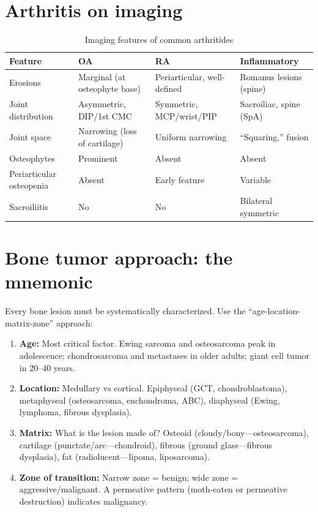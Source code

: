\section{Arthritis on imaging}

\begin{table}[h]
\centering
\caption{Imaging features of common arthritides}
\label{tab:arthritis}
\begin{tabular}{@{}p{}p{}p{}p{}@{}}
\hline
\textbf{Feature} & \textbf{OA} & \textbf{RA} & \textbf{Inflammatory} \\
\hline
Erosions & Marginal (at osteophyte base) & Periarticular, well-defined & Romanus lesions (spine) \\
Joint distribution & Asymmetric, DIP/1st CMC & Symmetric, MCP/wrist/PIP & Sacroiliac, spine (SpA) \\
Joint space & Narrowing (loss of cartilage) & Uniform narrowing & ``Squaring,'' fusion \\
Osteophytes & Prominent & Absent & Absent \\
Periarticular osteopenia & Absent & Early feature & Variable \\
Sacroiliitis & No & No & Bilateral symmetric \\
\hline
\end{tabular}
\end{table}

\section{Bone tumor approach: the mnemonic}
Every bone lesion must be systematically characterized. Use the ``age-location-matrix-zone'' approach:

\begin{enumerate}
    \item \textbf{Age:} Most critical factor. Ewing sarcoma and osteosarcoma peak in adolescence; chondrosarcoma and metastases in older adults; giant cell tumor in 20--40 years.
    \item \textbf{Location:} Medullary vs cortical. Epiphyseal (GCT, chondroblastoma), metaphyseal (osteosarcoma, enchondroma, ABC), diaphyseal (Ewing, lymphoma, fibrous dysplasia).
    \item \textbf{Matrix:} What is the lesion made of? Osteoid (cloudy/bony---osteosarcoma), cartilage (punctate/arc---chondroid), fibrous (ground glass---fibrous dysplasia), fat (radiolucent---lipoma, liposarcoma).
    \item \textbf{Zone of transition:} Narrow zone = benign; wide zone = aggressive/malignant. A permeative pattern (moth-eaten or permeative destruction) indicates malignancy.
\end{enumerate}

